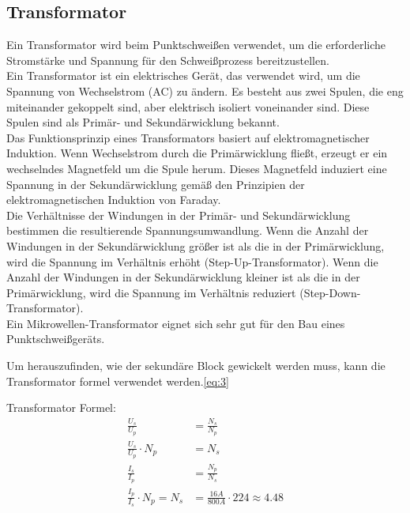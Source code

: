

\subsection*{ Transformator}

Ein Transformator wird beim Punktschweißen verwendet, um die erforderliche Stromstärke und Spannung für den Schweißprozess bereitzustellen.\\

Ein Transformator ist ein elektrisches Gerät, das verwendet wird, um die Spannung von Wechselstrom (AC) zu ändern.
Es besteht aus zwei Spulen, die eng miteinander gekoppelt sind, aber elektrisch isoliert voneinander sind.
Diese Spulen sind als Primär- und Sekundärwicklung bekannt.\\


Das Funktionsprinzip eines Transformators basiert auf elektromagnetischer Induktion.
Wenn Wechselstrom durch die Primärwicklung fließt, erzeugt er ein wechselndes Magnetfeld um die Spule herum.
Dieses Magnetfeld induziert eine Spannung in der Sekundärwicklung gemäß den Prinzipien der elektromagnetischen Induktion von Faraday.\\


Die Verhältnisse der Windungen in der Primär- und Sekundärwicklung bestimmen die resultierende Spannungsumwandlung.
Wenn die Anzahl der Windungen in der Sekundärwicklung größer ist als die in der Primärwicklung, wird die Spannung im Verhältnis erhöht (Step-Up-Transformator).
Wenn die Anzahl der Windungen in der Sekundärwicklung kleiner ist als die in der Primärwicklung, wird die Spannung im Verhältnis reduziert (Step-Down-Transformator).\\



Ein Mikrowellen-Transformator eignet sich sehr gut für den Bau eines Punktschweißgeräts.


Um herauszufinden, wie der sekundäre Block gewickelt werden muss, kann die Transformator formel verwendet werden.\ref{eq:3}

Transformator Formel:
\begin{align}%
        \frac{U_s}{U_p} &= \frac{N_s}{N_p}\\
        \frac{U_s}{U_p}\cdot N_p &= N_s \\
        \frac{I_s}{I_p} &=\frac{N_p}{N_s}\\
        \frac{I_p}{I_s} \cdot N_p = N_s &= \frac{16A}{800A}\cdot 224 \approx 4.48
        \label{eq:3}
\end{align}
        
